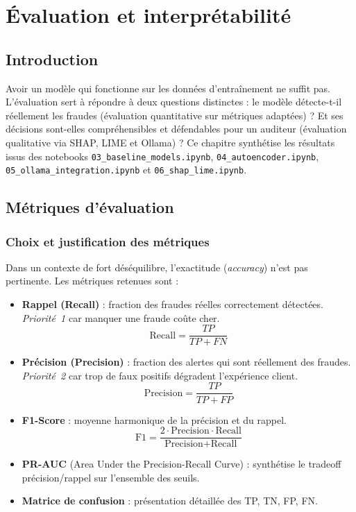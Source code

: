 \documentclass[12pt,a4paper,twoside]{report}
\begin{document}
\chapter{Évaluation et interprétabilité}

\section{Introduction}

Avoir un modèle qui fonctionne sur les données d'entraînement ne suffit pas. L'évaluation sert à répondre à deux questions distinctes : le modèle détecte-t-il réellement les fraudes (évaluation quantitative sur métriques adaptées) ? Et ses décisions sont-elles compréhensibles et défendables pour un auditeur (évaluation qualitative via SHAP, LIME et Ollama) ? Ce chapitre synthétise les résultats issus des notebooks \texttt{03\_baseline\_models.ipynb}, \texttt{04\_autoencoder.ipynb}, \texttt{05\_ollama\_integration.ipynb} et \texttt{06\_shap\_lime.ipynb}.

\section{Métriques d'évaluation}

\subsection{Choix et justification des métriques}

Dans un contexte de fort déséquilibre, l'exactitude (\textit{accuracy}) n'est pas pertinente. Les métriques retenues sont :

\begin{itemize}
  \item \textbf{Rappel (Recall)} : fraction des fraudes réelles correctement détectées. \textit{Priorité~1} car manquer une fraude coûte cher.
    \[ \text{Recall} = \frac{TP}{TP + FN} \]
  \item \textbf{Précision (Precision)} : fraction des alertes qui sont réellement des fraudes. \textit{Priorité~2} car trop de faux positifs dégradent l'expérience client.
    \[ \text{Precision} = \frac{TP}{TP + FP} \]
  \item \textbf{F1-Score} : moyenne harmonique de la précision et du rappel.
    \[ \text{F1} = \frac{2 \cdot \text{Precision} \cdot \text{Recall}}{\text{Precision} + \text{Recall}} \]
  \item \textbf{PR-AUC} (Area Under the Precision-Recall Curve) : synthétise le tradeoff précision/rappel sur l'ensemble des seuils.
  \item \textbf{Matrice de confusion} : présentation détaillée des TP, TN, FP, FN.
\end{itemize}
\end{document}

